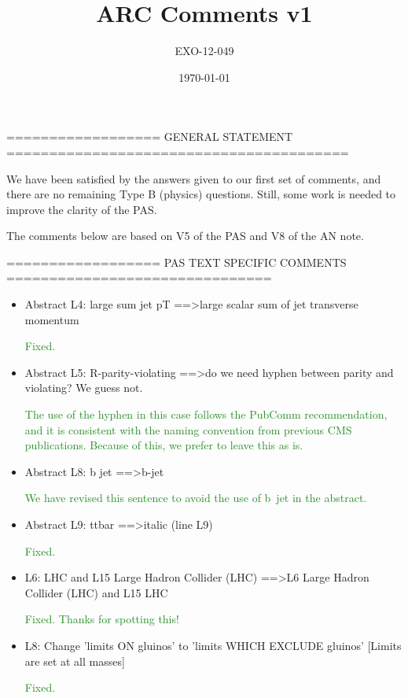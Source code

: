 \documentclass[paper=a4, fontsize=11pt]{scrartcl}
\title{ARC Comments v1}
\author{EXO-12-049}
\date{\today}
\begin{document}
================== GENERAL STATEMENT ======================================== 


We have been satisfied by the answers given to our first set of comments, and 
there are no remaining Type B (physics) questions. Still, some work is needed 
to improve the clarity of the PAS. 


The comments below are based on V5 of the PAS and V8 of the AN note. 


================== PAS TEXT SPECIFIC COMMENTS =============================== 

\begin{itemize}
\item Abstract L4: 
large sum jet pT ==\textgreater large scalar sum of jet transverse momentum 

\textcolor{ForestGreen}{Fixed.}\\

\item Abstract L5: 
R-parity-violating ==\textgreater do we need hyphen between parity and violating? We 
guess not. 

\textcolor{ForestGreen}{The use of the hyphen in this case follows the PubComm
recommendation, and it is consistent with the naming convention from previous
CMS publications. Because of this, we prefer to leave this as is.}\\

\item Abstract L8: 
b jet ==\textgreater b-jet 

\textcolor{ForestGreen}{We have revised this sentence to avoid the use of b~jet
in the abstract.}\\

\item Abstract L9: 
ttbar ==\textgreater italic (line L9) 

\textcolor{ForestGreen}{Fixed.}\\

\item L6: 
LHC and L15 Large Hadron Collider (LHC) 
==\textgreater L6 Large Hadron Collider (LHC) and L15 LHC 

\textcolor{ForestGreen}{Fixed. Thanks for spotting this!}\\

\item L8: 
Change 'limits ON gluinos' to 'limits WHICH EXCLUDE gluinos' 
[Limits are set at all masses] 

\textcolor{ForestGreen}{Fixed.}\\


\end{itemize}
\end{document}
